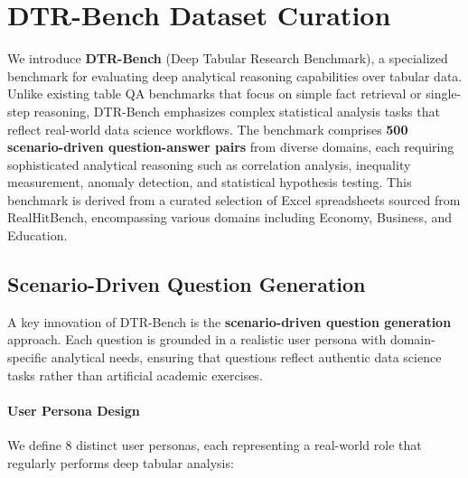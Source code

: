 \section{DTR-Bench Dataset Curation}
We introduce \textbf{DTR-Bench} (Deep Tabular Research Benchmark), a specialized benchmark for evaluating deep analytical reasoning capabilities over tabular data. Unlike existing table QA benchmarks that focus on simple fact retrieval or single-step reasoning, DTR-Bench emphasizes complex statistical analysis tasks that reflect real-world data science workflows. The benchmark comprises \textbf{500 scenario-driven question-answer pairs} from diverse domains, each requiring sophisticated analytical reasoning such as correlation analysis, inequality measurement, anomaly detection, and statistical hypothesis testing. 
This benchmark is derived from a curated selection of Excel spreadsheets sourced from RealHitBench, encompassing various domains including Economy, Business, and Education.

\subsection{Scenario-Driven Question Generation}
\label{sec:question_generation}

A key innovation of DTR-Bench is the \textbf{scenario-driven question generation} approach. Each question is grounded in a realistic user persona with domain-specific analytical needs, ensuring that questions reflect authentic data science tasks rather than artificial academic exercises.

\paragraph{User Persona Design}
\label{sec:personas}

We define 8 distinct user personas, each representing a real-world role that regularly performs deep tabular analysis:

